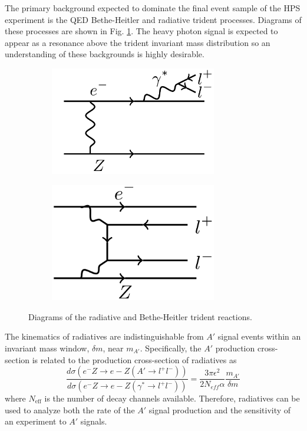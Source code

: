 The primary background expected to dominate the final event sample of the HPS 
experiment is the QED Bethe-Heitler and radiative trident processes.  Diagrams
of these processes are shown in Fig. \ref{fig:tridents}. The heavy photon 
signal is expected to appear as a resonance above the trident invariant mass
distribution so an understanding of these backgrounds is highly desirable. 
\begin{figure}[t]
    \begin{subfigure}{.5\textwidth}
        \centering
        \includegraphics[width=0.8\textwidth]{images/radiative.png}
    \end{subfigure}
    \begin{subfigure}{.5\textwidth}
        \centering
        \includegraphics[width=0.8\textwidth]{images/bethe-heitler.png}
    \end{subfigure}
    \caption{Diagrams of the radiative and Bethe-Heitler trident reactions.}
    \label{fig:tridents}
\end{figure}  

The kinematics of radiatives are indistinguishable from $A'$ signal events 
within an invariant mass window, $\delta m$, near $m_{A'}$. Specifically, 
the $A'$ production cross-section is related to the production cross-section of 
radiatives as 
\begin{equation}
    \frac{d\sigma(e^-Z\rightarrow e-Z(A'\rightarrow l^+l^-))}
    {d\sigma(e^-Z\rightarrow e-Z(\gamma^*\rightarrow l^+l^-))}
    = \frac{3\pi\epsilon^{2}}{2 N_{eff} \alpha} \frac{m_{A'}}{\delta m}
\end{equation}
where $N_{\text{eff}}$ is the number of decay channels available.
Therefore, radiatives can be used to analyze both the rate of the $A'$ signal 
production and the sensitivity of an experiment to $A'$ signals.

